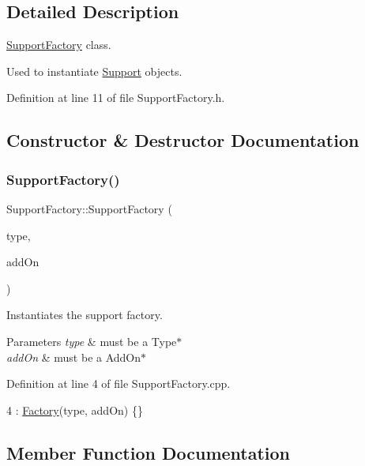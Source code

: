 \subsection{Detailed Description}
\hyperlink{classSupportFactory}{Support\+Factory} class. 

Used to instantiate \hyperlink{classSupport}{Support} objects. 

Definition at line 11 of file Support\+Factory.\+h.



\subsection{Constructor \& Destructor Documentation}
\mbox{\label{classSupportFactory_a8e0b10fb625f7d4a93cec9989bef45c4}} 
\subsubsection{\texorpdfstring{Support\+Factory()}{SupportFactory()}}
{\footnotesize\ttfamily Support\+Factory\+::\+Support\+Factory (\begin{DoxyParamCaption}\item[{\hyperlink{classType}{Type} $\ast$}]{type,  }\item[{\hyperlink{classAddOn}{Add\+On} $\ast$}]{add\+On }\end{DoxyParamCaption})}



Instantiates the support factory. 


\begin{DoxyParams}{Parameters}
{\em type} & must be a Type$\ast$ \\
\hline
{\em add\+On} & must be a Add\+On$\ast$ \\
\hline
\end{DoxyParams}


Definition at line 4 of file Support\+Factory.\+cpp.


\begin{DoxyCode}
4 : \hyperlink{classFactory_aca946f8877efb5b5bae700f74537d99d}{Factory}(type, addOn) \{\}
\end{DoxyCode}


\subsection{Member Function Documentation}
\mbox{\label{classSupportFactory_a802c25e901b479656ea95a5678a1ad26}} 
